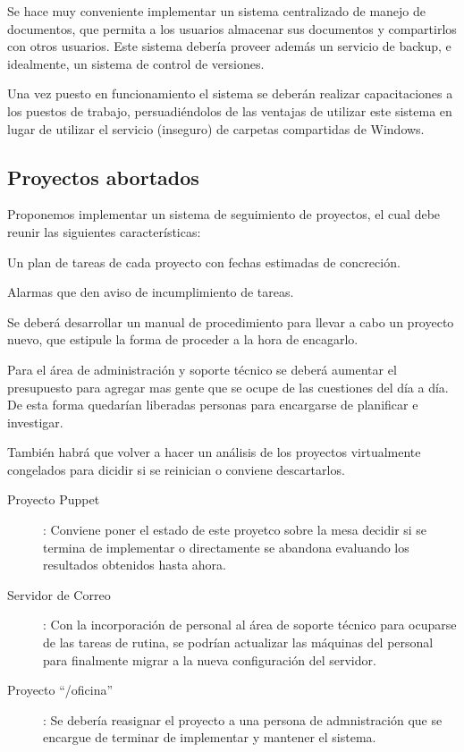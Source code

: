\documentclass[a4paper,11pt,oneside]{article}
\begin{document}
Se hace muy conveniente implementar un sistema centralizado de manejo
de documentos, que permita a los usuarios almacenar sus documentos y
compartirlos con otros usuarios. Este sistema debería proveer además
un servicio de backup, e idealmente, un sistema de control de
versiones.

Una vez puesto en funcionamiento el sistema se deberán realizar
capacitaciones a los puestos de trabajo, persuadiéndolos de las
ventajas de utilizar este sistema en lugar de utilizar el servicio
(inseguro) de carpetas compartidas de Windows.
\newpage
\subsection{Proyectos abortados}
Proponemos implementar un sistema de seguimiento de proyectos, el cual
debe reunir las siguientes características:
\begin{itemize*}
\item Un plan de tareas de cada proyecto con fechas estimadas de
  concreción.
\item Alarmas que den aviso de incumplimiento de tareas.
\end{itemize*}
Se deberá desarrollar un manual de procedimiento para llevar a cabo un
proyecto nuevo, que estipule la forma de proceder a la hora de
encagarlo.

Para el área de administración y soporte técnico se deberá aumentar el
presupuesto para agregar mas gente que se ocupe de las cuestiones del
día a día. De esta forma quedarían liberadas personas para encargarse
de planificar e investigar.

También habrá que volver a hacer un análisis de los proyectos
virtualmente congelados para dicidir si se reinician o conviene
descartarlos.

\begin{description}
\item[Proyecto Puppet]: Conviene poner el estado de este proyetco
  sobre la mesa decidir si se termina de implementar o directamente se
  abandona evaluando los resultados obtenidos hasta ahora.
\item[Servidor de Correo]: Con la incorporación de personal al área de
  soporte técnico para ocuparse de las tareas de rutina, se podrían
  actualizar las máquinas del personal para finalmente migrar a la
  nueva configuración del servidor.
\item[Proyecto ``/oficina'']: Se debería reasignar el proyecto a una
  persona de admnistración que se encargue de terminar de implementar
  y mantener el sistema.
\end{description}
\end{document}
